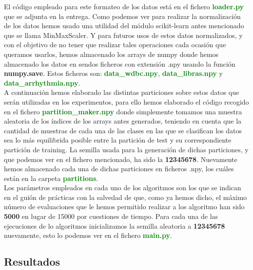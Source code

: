 \documentclass[10pt,a4paper]{article}
\begin{document}
El código empleado para este formateo de los datos está en el fichero \textbf{\textcolor{green}{loader.py}} que se adjunta en la entrega. Como podemos ver para realizar la normalización de los datos hemos usado una utilidad del módulo scikit-learn antes mencionado que se llama MinMaxScaler. Y para futuros usos de estos datos normalizados, y con el objetivo de no tener que realizar tales operaciones cada ocasión que queramos usarlos, hemos almacenado los arrays de numpy donde hemos almacenado los datos en sendos ficheros con extensión .npy usando la función \textbf{numpy.save}. Estos ficheros son: \textbf{\textcolor{green}{data\_wdbc.npy}}, \textbf{\textcolor{green}{data\_libras.npy}} y \textbf{\textcolor{green}{data\_arrhythmia.npy}}.\\

A continuación hemos elaborado las distintas particiones sobre estos datos que serán utilizadas en los experimentos, para ello hemos elaborado el código recogido en el fichero \textbf{\textcolor{green}{partition\_maker.npy}} donde simplemente tomamos una muestra aleatoria de los índices de los arrays antes generados, teniendo en cuenta que la cantidad de muestras de cada una de las clases en las que se clasifican los datos sea lo más equilibrida posible entre la partición de test y su correspondiente partición de training. La semilla usada para la generación de dichas particiones, y que podemos ver en el fichero mencionado, ha sido la \textbf{12345678}. Nuevamente hemos almacenado cada una de dichas particiones en ficheros .npy, los cuáles están en la carpeta \textbf{\textcolor{green}{partitions}}.\\

Los parámetros empleados en cada uno de los algoritmos son los que se indican en el guión de prácticas con la salvedad de que, como ya hemos dicho, el máximo número de evaluaciones que le hemos permitido realizar a los algoritmo han sido \textbf{5000} en lugar de 15000 por cuestiones de tiempo. Para cada una de las ejecuciones de lo algoritmos inicializamos la semilla aleatoria a \textbf{12345678} nuevamente, esto lo podemos ver en el fichero \textbf{\textcolor{green}{main.py}}.\\


\subsection{\color[rgb]{0.0,0.0,0.51}Resultados}
\end{document}
